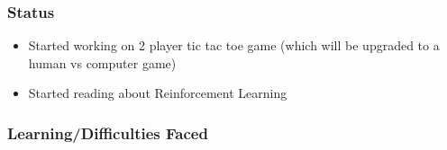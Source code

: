 \documentclass{beamer}
\begin{document}
\begin{frame}
    \frametitle{Status}
    \begin{itemize}
        \item Started working on 2 player tic tac toe game (which will be upgraded to a human vs computer game)
        \item Started reading about Reinforcement Learning
    \end{itemize}
\end{frame}

\begin{frame}
    \frametitle{Learning/Difficulties Faced}
\end{frame}
\end{document}
